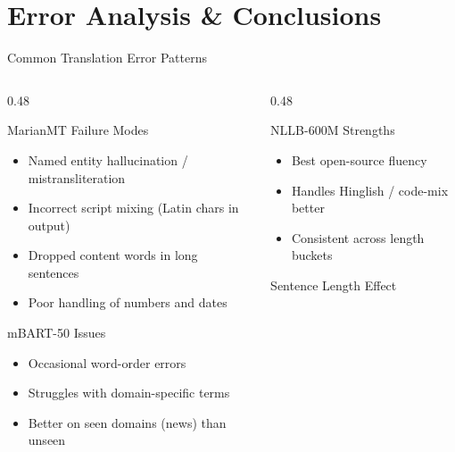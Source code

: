 \documentclass[aspectratio=169]{beamer}
\begin{document}
\section{Error Analysis \& Conclusions}

\begin{frame}{Common Translation Error Patterns}
  \begin{columns}[T]
    \begin{column}{0.48\textwidth}
      \begin{alertblock}{MarianMT Failure Modes}
        \begin{itemize}
          \item Named entity hallucination / mistransliteration
          \item Incorrect script mixing (Latin chars in output)
          \item Dropped content words in long sentences
          \item Poor handling of numbers and dates
        \end{itemize}
      \end{alertblock}
      \vspace{0.3cm}
      \begin{block}{mBART-50 Issues}
        \begin{itemize}
          \item Occasional word-order errors
          \item Struggles with domain-specific terms
          \item Better on seen domains (news) than unseen
        \end{itemize}
      \end{block}
    \end{column}
    \begin{column}{0.48\textwidth}
      \begin{block}{NLLB-600M Strengths}
        \begin{itemize}
          \item Best open-source fluency
          \item Handles Hinglish / code-mix better
          \item Consistent across length buckets
        \end{itemize}
      \end{block}
      \vspace{0.3cm}
      \begin{block}{Sentence Length Effect}

\end{block}
\end{column}
\end{columns}
\end{frame}
\end{document}
